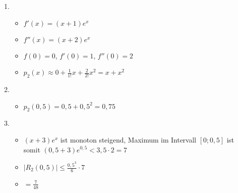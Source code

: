 \item
\begin{enumerate}

\item
\begin{itemize}
\item $f'(x) = (x+1)e^x$
\item $f''(x) = (x+2)e^x$
\item $f(0) = 0$, $f'(0) = 1$, $f''(0)=2$
\item $p_2(x) \approx 0 + \frac{1}{1!} x + \frac{2}{2!} x^2 = x+x^2$
\end{itemize}

\item
\begin{itemize}
\item $p_2(0{,}5) = 0{,}5+0{,}5^2 = 0{,}75$
\end{itemize}

\item
\begin{itemize}
\item $(x+3)e^x$ ist monoton steigend, Maximum im Intervall $[0;0{,}5]$ ist somit $(0{,}5+3)e^{0{,}5} < 3{,}5\cdot 2 = 7$
\item $|R_2(0{,}5)| \le \frac{0{,}5^3}{6}\cdot 7$
\item $=\frac{7}{48}$
\end{itemize}

\end{enumerate}
